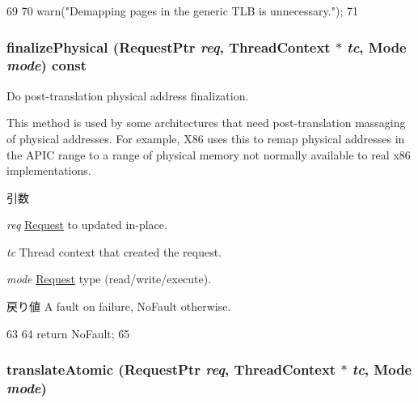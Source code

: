 \begin{DoxyCode}
69 {
70     warn("Demapping pages in the generic TLB is unnecessary.\n");
71 }
\end{DoxyCode}
\hypertarget{classGenericTLB_ae199d95c42e036851a8a0543c6d6d2e3}{
\subsubsection[{finalizePhysical}]{ finalizePhysical ({\bf RequestPtr} {\em req}, \/  {\bf ThreadContext} $\ast$ {\em tc}, \/  {\bf Mode} {\em mode}) const}}
\label{classGenericTLB_ae199d95c42e036851a8a0543c6d6d2e3}
Do post-\/translation physical address finalization.

This method is used by some architectures that need post-\/translation massaging of physical addresses. For example, X86 uses this to remap physical addresses in the APIC range to a range of physical memory not normally available to real x86 implementations.


\begin{DoxyParams}{引数}
\item[{\em req}]\hyperlink{classRequest}{Request} to updated in-\/place. \item[{\em tc}]Thread context that created the request. \item[{\em mode}]\hyperlink{classRequest}{Request} type (read/write/execute). \end{DoxyParams}
\begin{DoxyReturn}{戻り値}
A fault on failure, NoFault otherwise. 
\end{DoxyReturn}



\begin{DoxyCode}
63 {
64     return NoFault;
65 }
\end{DoxyCode}
\hypertarget{classGenericTLB_ad54e01e3c0a1613098a76b7f92e5be93}{
\subsubsection[{translateAtomic}]{ translateAtomic ({\bf RequestPtr} {\em req}, \/  {\bf ThreadContext} $\ast$ {\em tc}, \/  {\bf Mode} {\em mode})}}
\label{classGenericTLB_ad54e01e3c0a1613098a76b7f92e5be93}




